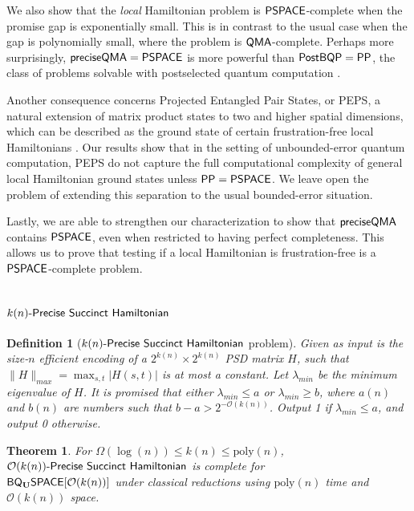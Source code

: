 \documentclass[11pt]{article}
\newcommand{\classfont}{\sf}
\newtheorem{theorem}[lemma]{Theorem}
\newtheorem{definition}[lemma]{Definition}
\numberwithin{lemma}{section}
\theoremstyle{definition}
\newcommand\PostBQP{{\sf{PostBQP}}}
\newcommand\PP{\sf{PP}}
\newcommand\PSPACE{\sf{PSPACE}}
\newcommand\preciseQMA{{\sf{preciseQMA}}}
\newcommand\QMA{{\sf{QMA}}}
\newcommand{\Unitary}{\mathbf{U}}
\newcommand{\unitaryBQSPACE}[1]{{\classfont{BQ}_\Unitary\classfont{SPACE}}[#1]}
\newcommand{\poly}{\mathrm{poly}}
\renewcommand{\le}{\leqslant}
\renewcommand{\ge}{\geqslant}
\newcommand\psham[1]{#1\textit{\sf{-Precise Succinct Hamiltonian}}}
\begin{document}
We also show that the \emph{local} Hamiltonian problem is $\PSPACE$-complete when the promise gap is exponentially small. This is in contrast to the usual case when the gap is polynomially small, where the problem is $\QMA$-complete. Perhaps more surprisingly, $\preciseQMA = \PSPACE$ is more powerful than $\PostBQP=\PP$, the class of problems solvable with postselected quantum computation \cite{aaronson05}.

Another consequence concerns Projected Entangled Pair States, or PEPS, a natural extension of matrix product states to two and higher spatial dimensions, which can be described as the ground state of certain frustration-free local Hamiltonians \cite{vc04}. Our results show that in the setting of unbounded-error quantum computation, PEPS do not capture the full computational complexity of general local Hamiltonian ground states unless $\PP=\PSPACE$. We leave open the problem of extending this separation to the usual bounded-error situation.

Lastly, we are able to strengthen our characterization to show that $\preciseQMA$ contains $\PSPACE$, even when restricted to having perfect completeness.  This allows us to prove that testing if a local Hamiltonian is frustration-free is a $\PSPACE$-complete problem.

\section{$\psham{k(n)}$}

\begin{definition}
[$\psham{k(n)}$ problem] \label{def: spechamiltonian}
Given as input is the size-$n$ efficient encoding of a $2^{k(n)} \times 2^{k(n)}$ PSD matrix $H$, such that %
 $\|H\|_{max} = \max_{s,t}|H(s,t)|$ is at most a constant. Let $\lambda_{min}$ be the minimum eigenvalue of $H$. It is promised that either $\lambda_{min} \le a$ or $\lambda_{min} \ge b$, where $a(n)$ and $b(n)$ are numbers such that $b-a > 2^{-\mathcal{O}(k(n))}$. Output 1 if $\lambda_{min} \le a$, and output 0 otherwise.
\end{definition}

\begin{theorem} \label{thm: spechamiltonian}
For $\Omega(\log(n)) \le k(n) \le \poly(n)$, $\psham{\mathcal{O}(k(n))}$ is complete for \\ $\unitaryBQSPACE{\mathcal{O}(k(n))}$ under classical reductions using $\poly(n)$ time and $\mathcal{O}(k(n))$ space.
\end{theorem}
\end{document}
